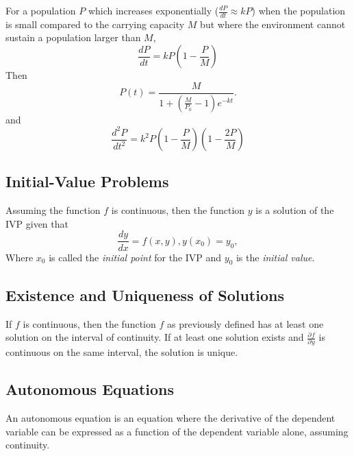 \begin{definition} For a population $P$ which increases exponentially ($\frac{dP}{dt} \approx kP$) when the population is small compared to the carrying capacity $M$ but where the environment cannot sustain a population larger than $M$,
  \[
    \frac{dP}{dt} = kP \left(1 - \frac{P}{M}\right)
  \]
  Then
  \[
    P(t) = \frac{M}{1 + \left(\frac{M}{P_0} - 1\right)e^{-kt}}.
  \]
  and
  \[
    \frac{d^2P}{dt^2} = k^2P \left(1 - \frac{P}{M}\right) \left(1 - \frac{2P}{M}\right)
  \]
\end{definition}

\subsection{Initial-Value Problems}

\begin{definition}
    Assuming the function $f$ is continuous, then the function $y$ is a solution of the IVP given that
    \[
        \frac{dy}{dx} = f(x,y), y(x_0) = y_0,
    \]
    Where $x_0$ is called the \textit{initial point} for the IVP and $y_0$ is the \textit{initial value}.
\end{definition}

\subsection{Existence and Uniqueness of Solutions}

\begin{theorem}
    If $f$ is continuous, then the function $f$ as previously defined has at least one solution on the interval of continuity. If at least one solution exists and $\frac{\partial^{}f}{\partial^{}y}$ is continuous on the same interval, the solution is unique.
\end{theorem}

\subsection{Autonomous Equations}

\begin{definition}
    An autonomous equation is an equation where the derivative of the dependent variable can be expressed as a function of the dependent variable alone, assuming continuity.
\end{definition}

